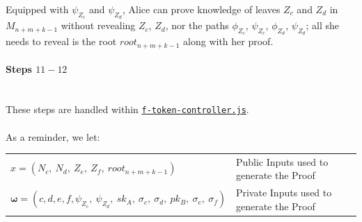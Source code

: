 \documentclass{article}
\begin{document}
\noindent
Equipped with $\psi_{Z_c}$ and $\psi_{Z_d}$, Alice can prove knowledge of leaves $Z_c$ and $Z_d$ in $M_{n+m+k-1}$ without revealing $Z_c$, $Z_d$, nor the paths $\phi_{Z_c}$, $\psi_{Z_c}$, $\phi_{Z_d}$, $\psi_{Z_d}$; all she needs to reveal is the root $root_{n+m+k-1}$ along with her proof.\\

\paragraph{Steps $11 - 12$}
\ \\
These steps are handled within \hyperref[sec:f-token-controller]{\texttt{f-token-controller.js}}.\\
\\
As a reminder, we let:
\begin{center}
  \begin{tabular}{l l}
    $x = (N_c,\
          N_d,\
          Z_e,\
          Z_f,\
          root_{n+m+k-1})$ & Public Inputs used to generate the Proof\\
    $\bm\omega = (c, d, e, f,
              \psi_{Z_c},\
              \psi_{Z_d},\
              sk_A,\
              \sigma_c,\
              \sigma_d,\
              pk_B,\
              \sigma_e,\
              \sigma_f)$ & Private Inputs used to generate the Proof\\
  \end{tabular}
\end{center}
\end{document}
